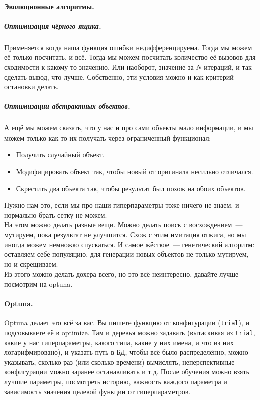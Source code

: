 \documentclass{article}
\begin{document}
    \paragraph{Эволюционные алгоритмы.}
    \subparagraph{Оптимизация чёрного ящика.}
    Применяется когда наша функция ошибки недифференцируема. Тогда мы можем её только посчитать, и всё. Тогда мы можем посчитать количество её вызовов для сходимости к какому-то значению. Или наоборот, значение за $N$ итераций, и так сделать вывод, что лучше. Собственно, эти условия можно и как критерий остановки делать.
    \subparagraph{Оптимизации абстрактных объектов.}
    А ещё мы можем сказать, что у нас и про сами объекты мало информации, и мы можем только как-то их получать через ограниченный функционал:
    \begin{itemize}
        \item Получить случайный объект.
        \item Модифицировать объект так, чтобы новый от оригинала несильно отличался.
        \item Скрестить два объекта так, чтобы результат был похож на обоих объектов.
    \end{itemize}
    Нужно нам это, если мы про наши гиперпараметры тоже ничего не знаем, и нормально брать сетку не можем.\\
    На этом можно делать разные вещи. Можно делать поиск с восхождением~--- мутируем, пока результат не улучшится. Схож с этим имитация отжига, но мы иногда можем немножко спускаться. И самое жёсткое~--- генетический алгоритм: оставляем себе популяцию, для генерации новых объектов не только мутируем, но и скрещиваем.\\
    Из этого можно делать дохера всего, но это всё неинтересно, давайте лучше посмотрим на optuna.
    \paragraph{Optuna.}
    Optuna делает это всё за вас. Вы пишете функцию от конфигурации (\Verb|trial|), и подсовываете её в optimize. Там и деревья можно задавать (вытаскивая из \Verb|trial|, какие у нас гиперпараметры, какого типа, какие у них имена, и что из них логарифмировано), и указать путь в БД, чтобы всё было распределённо, можно указывать, сколько раз (или сколько времени) вычислять, неперспективные конфигурации можно заранее останавливать и т.д. После обучения можно взять лучшие параметры, посмотреть историю, важность каждого параметра и зависимость значения целевой функции от гиперпараметров.
\end{document}
